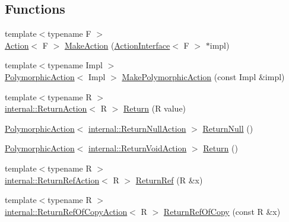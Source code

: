 \subsection*{Functions}
\begin{DoxyCompactItemize}
\item 
{\footnotesize template$<$typename F $>$ }\\\mbox{\hyperlink{classtesting_1_1Action}{Action}}$<$ F $>$ \mbox{\hyperlink{namespacetesting_ae6b9960db2b2685e043ce5215291f5b8}{Make\+Action}} (\mbox{\hyperlink{classtesting_1_1ActionInterface}{Action\+Interface}}$<$ F $>$ $\ast$impl)
\item 
{\footnotesize template$<$typename Impl $>$ }\\\mbox{\hyperlink{classtesting_1_1PolymorphicAction}{Polymorphic\+Action}}$<$ Impl $>$ \mbox{\hyperlink{namespacetesting_a36bd06c5ea972c6df0bd9f40a7a94c65}{Make\+Polymorphic\+Action}} (const Impl \&impl)
\item 
{\footnotesize template$<$typename R $>$ }\\\mbox{\hyperlink{classtesting_1_1internal_1_1ReturnAction}{internal\+::\+Return\+Action}}$<$ R $>$ \mbox{\hyperlink{namespacetesting_af6d1c13e9376c77671e37545cd84359c}{Return}} (R value)
\item 
\mbox{\hyperlink{classtesting_1_1PolymorphicAction}{Polymorphic\+Action}}$<$ \mbox{\hyperlink{classtesting_1_1internal_1_1ReturnNullAction}{internal\+::\+Return\+Null\+Action}} $>$ \mbox{\hyperlink{namespacetesting_aa0331596e269114da101f810d3a1b88b}{Return\+Null}} ()
\item 
\mbox{\hyperlink{classtesting_1_1PolymorphicAction}{Polymorphic\+Action}}$<$ \mbox{\hyperlink{classtesting_1_1internal_1_1ReturnVoidAction}{internal\+::\+Return\+Void\+Action}} $>$ \mbox{\hyperlink{namespacetesting_a8da8e53d2e7bc4e3c531f7435ad04823}{Return}} ()
\item 
{\footnotesize template$<$typename R $>$ }\\\mbox{\hyperlink{classtesting_1_1internal_1_1ReturnRefAction}{internal\+::\+Return\+Ref\+Action}}$<$ R $>$ \mbox{\hyperlink{namespacetesting_a18eda8fe9c89ee856c199a2e04ca1641}{Return\+Ref}} (R \&x)
\item 
{\footnotesize template$<$typename R $>$ }\\\mbox{\hyperlink{classtesting_1_1internal_1_1ReturnRefOfCopyAction}{internal\+::\+Return\+Ref\+Of\+Copy\+Action}}$<$ R $>$ \mbox{\hyperlink{namespacetesting_ac1b75444c89371dc25ebcfcc48336201}{Return\+Ref\+Of\+Copy}} (const R \&x)
\item 

\end{DoxyCompactItemize}
